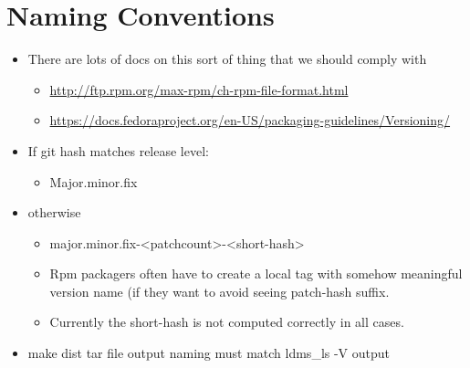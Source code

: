 \documentclass{article}
\begin{document}
    \section{Naming Conventions}
        \begin{itemize}    
            \item There are lots of docs on this sort of thing that we should comply with
                \begin{itemize}
                    \item \href{http://ftp.rpm.org/max-rpm/ch-rpm-file-format.html}{http://ftp.rpm.org/max-rpm/ch-rpm-file-format.html}
                    \item \href{https://docs.fedoraproject.org/en-US/packaging-guidelines/Versioning/}{https://docs.fedoraproject.org/en-US/packaging-guidelines/Versioning/}
            \end{itemize}
            \item If git hash matches release level:
                \begin{itemize}
                    \item Major.minor.fix
                \end{itemize}
            \item otherwise
                \begin{itemize}
                        \item major.minor.fix-<patchcount>-<short-hash>
                        \item Rpm packagers often have to create a local tag with somehow meaningful version name (if they want to avoid seeing patch-hash suffix.
                        \item Currently the short-hash is not computed correctly in all cases.
                \end{itemize}
            \item make dist tar file output naming must match ldms\_ls -V output
        \end{itemize}
\end{document}
